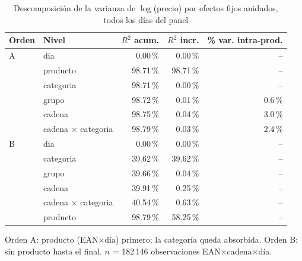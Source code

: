 \begin{table}[htbp]
\caption{Descomposici\'on de la varianza de $\log$(precio) por efectos fijos anidados, todos los d\'ias del panel}
\label{tab:varianza}
\centering\scriptsize\setlength{\tabcolsep}{3pt}
\begin{tabular}{@{}llrrr@{}}
\toprule
Orden & Nivel & $R^2$ acum. & $R^2$ incr. & \% var. intra-prod. \\
\midrule
A & dia & 0.00\,\% & 0.00\,\% & -- \\
 & producto & 98.71\,\% & 98.71\,\% & -- \\
 & categoria & 98.71\,\% & 0.00\,\% & -- \\
 & grupo & 98.72\,\% & 0.01\,\% & 0.6\,\% \\
 & cadena & 98.75\,\% & 0.04\,\% & 3.0\,\% \\
 & cadena $\times$ categoria & 98.79\,\% & 0.03\,\% & 2.4\,\% \\
\midrule
B & dia & 0.00\,\% & 0.00\,\% & -- \\
 & categoria & 39.62\,\% & 39.62\,\% & -- \\
 & grupo & 39.66\,\% & 0.04\,\% & -- \\
 & cadena & 39.91\,\% & 0.25\,\% & -- \\
 & cadena $\times$ categoria & 40.54\,\% & 0.63\,\% & -- \\
 & producto & 98.79\,\% & 58.25\,\% & -- \\
\bottomrule\end{tabular}
\par\smallskip\raggedright\scriptsize Orden A: producto (EAN$\times$d\'ia) primero; la categor\'ia queda absorbida. Orden B: sin producto hasta el final. $n$ = 182\,146 observaciones EAN$\times$cadena$\times$d\'ia.
\end{table}
